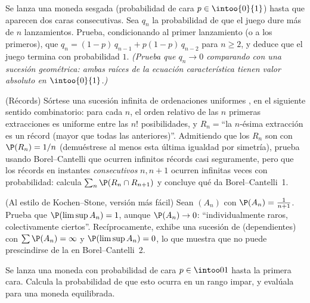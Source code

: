 \begin{exercise}[$\star\star$]\label{exo:b2:proba:6}
Se lanza una moneda sesgada (probabilidad de cara $p \in
\intoo{0}{1}$) hasta que aparecen dos caras consecutivas. Sea $q_n$
la probabilidad de que el juego dure más de $n$ lanzamientos. Prueba,
condicionando al primer lanzamiento (o a los primeros), que $q_n =
(1-p)\,q_{n-1} + p(1-p)\,q_{n-2}$ para $n \geq 2$, y deduce que el
juego termina con probabilidad $1$. \emph{(Prueba que $q_n \to 0$
comparando con una sucesión geométrica: ambas raíces de la ecuación
característica tienen valor absoluto en $\intoo{0}{1}$.)}
\end{exercise}

\begin{exercise}[$\star\star\star$]\label{exo:b2:proba:7}
(Récords) Sórtese una sucesión infinita de ordenaciones uniformes
, en el siguiente sentido combinatorio: para cada $n$,
el orden relativo de las $n$ primeras extracciones es uniforme entre
las $n!$ posibilidades, y $R_n = {}$``la $n$-ésima extracción es un
récord (mayor que todas las anteriores)''. Admitiendo que los
 $R_n$ son  con $\P(R_n) = 1/n$ (demuéstrese
al menos esta última igualdad por simetría), prueba usando
Borel--Cantelli que ocurren infinitos récords casi seguramente, pero
que los récords en instantes \emph{consecutivos} $n, n+1$ ocurren
infinitas veces con probabilidad: calcula $\sum_n \P(R_n \cap
R_{n+1})$ y concluye qué da Borel--Cantelli~1.
\end{exercise}

\begin{exercise}[$\star\star\star$]\label{exo:b2:proba:8}
(Al estilo de Kochen--Stone, versión más fácil) Sean $(A_n)$
 con $\P(A_n) = \frac{1}{n+1}$. Prueba que
$\P(\limsup A_n) = 1$, aunque $\P(A_n) \to 0$: ``individualmente
raros, colectivamente ciertos''. Recíprocamente, exhibe una sucesión
de  (dependientes) con $\sum\P(A_n) = \infty$ y $\P(\limsup
A_n) = 0$, lo que muestra que no puede prescindirse de la
 en Borel--Cantelli~2.
\end{exercise}

\begin{exercise}[$\star$]\label{exo:b2:proba:9}
Se lanza una moneda con probabilidad de cara $p \in \intoo01$ hasta
la primera cara. Calcula la probabilidad de que esto ocurra en un
rango impar, y evalúala para una moneda equilibrada.
\end{exercise}

